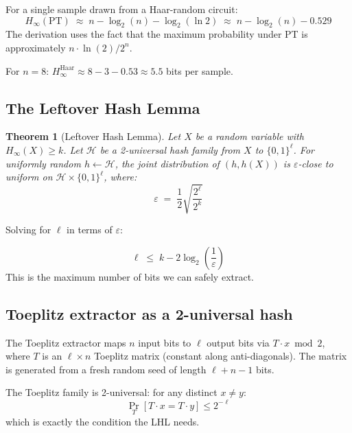 \documentclass[11pt,a4paper]{article}
\theoremstyle{plain}
\newtheorem{theorem}{Theorem}[section]
\theoremstyle{definition}
\theoremstyle{remark}
\newcommand{\Hmin}{H_{\infty}}
\renewcommand{\Pr}{\operatorname{Pr}}
\begin{document}
For a single sample drawn from a Haar-random circuit:
\begin{equation}
\Hmin(\mathrm{PT}) \;\approx\; n - \log_2(n) - \log_2(\ln 2) \;\approx\; n - \log_2(n) - 0.529
\end{equation}
The derivation uses the fact that the maximum probability under PT is approximately $n \cdot \ln(2) / 2^n$.

For $n=8$: $\Hmin^{\mathrm{Haar}} \approx 8 - 3 - 0.53 \approx 5.5$ bits per sample.

\subsection{The Leftover Hash Lemma}

\begin{theorem}[Leftover Hash Lemma]
Let $X$ be a random variable with $\Hmin(X) \geq k$. Let $\mathcal{H}$ be a 2-universal hash family from $X$ to $\{0,1\}^{\ell}$. For uniformly random $h \leftarrow \mathcal{H}$, the joint distribution of $(h, h(X))$ is $\varepsilon$-close to uniform on $\mathcal{H} \times \{0,1\}^{\ell}$, where:
\begin{equation}
\varepsilon \;=\; \frac{1}{2}\sqrt{\frac{2^{\ell}}{2^k}}
\end{equation}
\end{theorem}

Solving for $\ell$ in terms of $\varepsilon$:
\begin{factbox}
\begin{equation}
\boxed{\ell \;\leq\; k - 2\log_2\!\left(\frac{1}{\varepsilon}\right)}
\label{eq:lhl}
\end{equation}
This is the maximum number of bits we can safely extract.
\end{factbox}

\subsection{Toeplitz extractor as a 2-universal hash}

The Toeplitz extractor maps $n$ input bits to $\ell$ output bits via $T \cdot x \bmod 2$, where $T$ is an $\ell \times n$ Toeplitz matrix (constant along anti-diagonals). The matrix is generated from a fresh random seed of length $\ell + n - 1$ bits.

The Toeplitz family is 2-universal: for any distinct $x \neq y$:
\begin{equation}
\Pr_T[T \cdot x = T \cdot y] \leq 2^{-\ell}
\end{equation}
which is exactly the condition the LHL needs.
\end{document}
